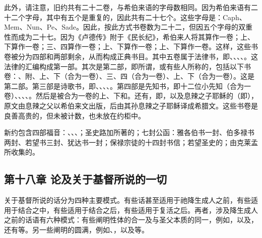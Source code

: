 此外，请注意，旧约共有二十二卷，与希伯来语的字母数相同。因为希伯来语有二十二个字母，其中有五个是重复的，因此共有二十七个。这些字母是：Caph、Mem、Nun、Pe、Sade。因此，按此方式书卷数为二十二，但因五个字母的双重性而成为二十七。因为《卢德传》附于《民长纪》，希伯来人将其算作一卷；上、下算作一卷；三、四算作一卷；上、下算作一卷；上、下算作一卷。这样，这些书卷被分为四部和两部剩余，从而构成正典书目。其中五卷属于法律书，即、、、、。这法律的汇编构成第一部。其次是第二部，即所谓，或有些人所称的，包括以下书卷：、附、上、下（合为一卷）、三、四（合为一卷）、上、下（合为一卷）。这是第二部。第三部是诗歌书，即、、、、。第四部是先知书，即十二位小先知（合为一卷）、、、、。然后是被合为一卷的上、下和。还有，即，以及息辣之子耶稣的（即），原文由息辣之父以希伯来文出版，后由其孙息辣之子耶稣译成希腊文。这些书卷是良善高贵的，但未被计数，也未放在约柜中。\par

新约包含四部福音：、、、；圣史路加所著的；七封公函：雅各伯书一封、伯多禄书两封、若望书三封、犹达书一封；保禄宗徒的十四封书信；若望圣史的；由克莱孟所收集的。\par


\subsection{第十八章 论及关于基督所说的一切}

关于基督所说的话分为四种主要模式。有些话甚至适用于祂降生成人之前，有些适用于结合之中，有些适用于结合之后，有些适用于复活之后。再者，涉及降生成人之前的话语有六种模式：有些阐明性体的合一及与圣父本质的同一，例如，以及，还有等。另一些阐明的圆满，例如、，以及等。\par

